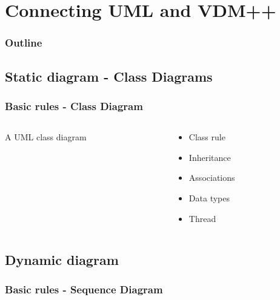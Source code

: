 %
%
\section{Connecting UML and VDM++}
%
%
\begin{frame}
  \frametitle{Outline}
  \tableofcontents[current]
\end{frame}


\subsection{Static diagram - Class Diagrams}

%
%
\frame
{
  \frametitle{Basic rules - Class Diagram}

\begin{columns}
\begin{column}[l]{5cm}

A UML class diagram


\end{column}
\begin{column}[r]{5cm}

  \begin{itemize}
  		\item Class rule
  		\item Inheritance
  		\item Associations
		\item Data types
  		\item Thread
	  	
  \end{itemize}

\end{column}
\end{columns}
}

\subsection{Dynamic diagram}

%
%
\frame
{
  \frametitle{Basic rules - Sequence Diagram}

}



